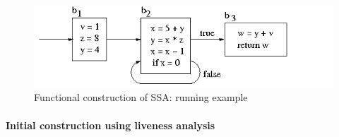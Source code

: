 
\begin{figure}
\begin{center}
\includegraphics[scale=0.5]{SSAConstructionExample1.png}
\end{center}
\caption{\label{fig:FunctionalCorrespondenceRunningExampleGraphic} Functional construction of SSA: running example}
\end{figure}

\paragraph{Initial construction using liveness analysis}

